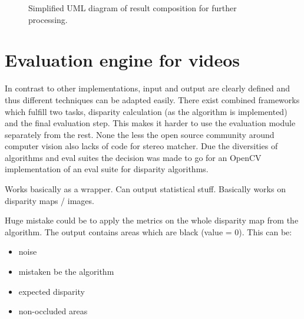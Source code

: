 \begin{figure}[h!]
  \centering
  \caption{Simplified UML diagram of result composition for further processing.}
\end{figure}


\section{Evaluation engine for videos}

In contrast to other implementations, input and output are clearly defined and thus different techniques can be adapted easily.
There exist combined frameworks which fulfill two tasks, disparity calculation (as the algorithm is implemented) and the final evaluation step.
This makes it harder to use the evaluation module separately from the rest.
None the less the open source community around computer vision also lacks of code for stereo matcher.
Due the diversities of algorithms and eval suites the decision was made to go for an OpenCV implementation of an eval suite for disparity algorithms.

Works basically as a wrapper. Can output statistical stuff. Basically works on disparity maps / images.

Huge mistake could be to apply the metrics on the whole disparity map from the algorithm. The output contains areas which are black (value = 0). This can be:

\begin{itemize}
  \item noise
  \item mistaken be the algorithm
  \item expected disparity
  \item non-occluded areas
\end{itemize}

